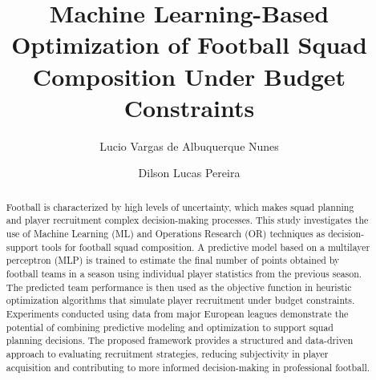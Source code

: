 \documentclass[a4paper,fleqn]{cas-sc}
\begin{document}
\let\WriteBookmarks\relax



\title [mode = title]{Machine Learning-Based Optimization of Football Squad Composition Under Budget Constraints}  

\tnotemark[1] 


%

\author[1]{Lucio Vargas de Albuquerque Nunes}


\author[1]{Dilson Lucas Pereira}




\begin{abstract}
Football is characterized by high levels of uncertainty, which makes squad planning and player recruitment complex decision-making processes. 
This study investigates the use of Machine Learning (ML) and Operations Research (OR) techniques as decision-support tools for football squad composition. 
A predictive model based on a multilayer perceptron (MLP) is trained to estimate the final number of points obtained by football teams in a season using 
individual player statistics from the previous season. 
The predicted team performance is then used as the objective function in heuristic optimization algorithms that simulate player recruitment under budget constraints. 
Experiments conducted using data from major European leagues demonstrate the potential of combining predictive modeling and 
optimization to support squad planning decisions. The proposed framework provides a structured and data-driven approach to evaluating recruitment strategies, 
reducing subjectivity in player acquisition and contributing to more informed decision-making in professional football.
\end{abstract}
\end{document}

